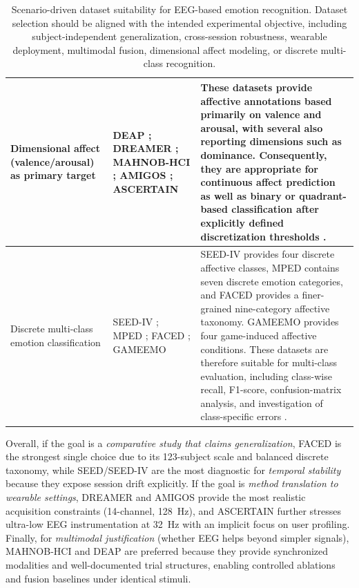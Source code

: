 \documentclass{WileyMSP-template}
\begin{document}
\begin{table}[H]
\begin{tabular}{|p{3.3cm}|p{4.6cm}|p{5.0cm}|}
Dimensional affect (valence/arousal) as primary target
&
DEAP \cite{koelstra2012deap}; 
DREAMER \cite{katsigiannis2018dreamer}; 
MAHNOB-HCI \cite{soleymani2012mahnob}; 
AMIGOS \cite{wang2024csur_researchprogress}; 
ASCERTAIN \cite{subramanian2018ascertain}
&
These datasets provide affective annotations based primarily on valence and arousal, with several also reporting dimensions such as dominance. Consequently, they are appropriate for continuous affect prediction as well as binary or quadrant-based classification after explicitly defined discretization thresholds \cite{geng2025dlreview}. \\
\hline

Discrete multi-class emotion classification
&
SEED-IV \cite{PeerJCS2065}; 
MPED \cite{song2019mped}; 
FACED \cite{chen2023faced}; 
GAMEEMO \cite{alakus2021gameemo}
&
SEED-IV provides four discrete affective classes, MPED contains seven discrete emotion categories, and FACED provides a finer-grained nine-category affective taxonomy. GAMEEMO provides four game-induced affective conditions. These datasets are therefore suitable for multi-class evaluation, including class-wise recall, F1-score, confusion-matrix analysis, and investigation of class-specific errors \cite{PeerJCS2065}. \\
\hline

\end{tabular}
\caption{Scenario-driven dataset suitability for EEG-based emotion recognition. Dataset selection should be aligned with the intended experimental objective, including subject-independent generalization, cross-session robustness, wearable deployment, multimodal fusion, dimensional affect modeling, or discrete multi-class recognition.}
\label{tab:scenario_map}
\end{table}

Overall, if the goal is a \emph{comparative study that claims generalization}, FACED is the strongest single choice due to its 123-subject scale and balanced discrete taxonomy, while SEED/SEED-IV are the most diagnostic for \emph{temporal stability} because they expose session drift explicitly. \cite{chen2023faced,seed_page,seediv_page}
If the goal is \emph{method translation to wearable settings}, DREAMER and AMIGOS provide the most realistic acquisition constraints (14-channel, 128~Hz), and ASCERTAIN further stresses ultra-low EEG instrumentation at 32~Hz with an implicit focus on user profiling. \cite{katsigiannis2018dreamer,amigos2018,subramanian2018ascertain}
Finally, for \emph{multimodal justification} (whether EEG helps beyond simpler signals), MAHNOB-HCI and DEAP are preferred because they provide synchronized modalities and well-documented trial structures, enabling controlled ablations and fusion baselines under identical stimuli. \cite{soleymani2012mahnob,koelstra2012deap}
\end{document}
